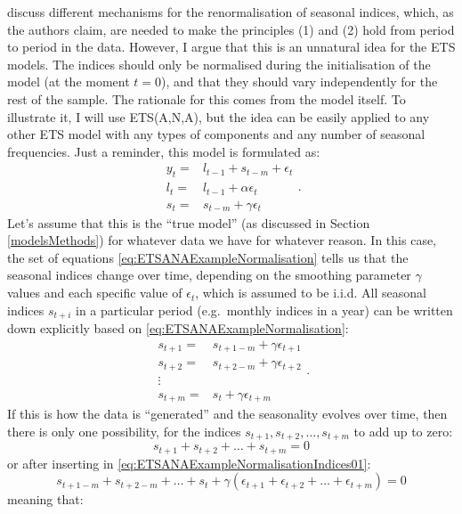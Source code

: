 \documentclass[]{book}
\theoremstyle{definition}
\theoremstyle{definition}
\theoremstyle{definition}
\theoremstyle{definition}
\theoremstyle{remark}
\begin{document}
\citet{Hyndman2008b} discuss different mechanisms for the renormalisation of seasonal indices, which, as the authors claim, are needed to make the principles (1) and (2) hold from period to period in the data. However, I argue that this is an unnatural idea for the ETS models. The indices should only be normalised during the initialisation of the model (at the moment \(t=0\)), and that they should vary independently for the rest of the sample. The rationale for this comes from the model itself. To illustrate it, I will use ETS(A,N,A), but the idea can be easily applied to any other ETS model with any types of components and any number of seasonal frequencies. Just a reminder, this model is formulated as:
\begin{equation}
  \begin{aligned}
  y_t = &l_{t-1} + s_{t-m} + \epsilon_t \\
  {l}_{t} = &l_{t-1} + \alpha\epsilon_t \\
  s_t = &s_{t-m} + \gamma\epsilon_t
  \end{aligned}.
  \label{eq:ETSANAExampleNormalisation}
\end{equation}
Let's assume that this is the ``true model'' (as discussed in Section \ref{modelsMethods}) for whatever data we have for whatever reason. In this case, the set of equations \eqref{eq:ETSANAExampleNormalisation} tells us that the seasonal indices change over time, depending on the smoothing parameter \(\gamma\) values and each specific value of \(\epsilon_t\), which is assumed to be i.i.d. All seasonal indices \(s_{t+i}\) in a particular period (e.g.~monthly indices in a year) can be written down explicitly based on \eqref{eq:ETSANAExampleNormalisation}:
\begin{equation}
  \begin{aligned}
  s_{t+1} = &s_{t+1-m} + \gamma\epsilon_{t+1} \\
  s_{t+2} = &s_{t+2-m} + \gamma\epsilon_{t+2} \\
  \vdots \\
  s_{t+m} = &s_{t} + \gamma\epsilon_{t+m}
  \end{aligned}.
  \label{eq:ETSANAExampleNormalisationIndices01}
\end{equation}
If this is how the data is ``generated'' and the seasonality evolves over time, then there is only one possibility, for the indices \(s_{t+1}, s_{t+2}, \dots, s_{t+m}\) to add up to zero:
\begin{equation}
  s_{t+1}+ s_{t+2}+ \dots+ s_{t+m} = 0
  \label{eq:ETSANAExampleNormalisationIndices02a}
\end{equation}
or after inserting in \eqref{eq:ETSANAExampleNormalisationIndices01}:
\begin{equation}
  s_{t+1-m}+ s_{t+2-m}+ \dots+ s_{t} + \gamma \left(\epsilon_{t+1}+ \epsilon_{t+2}+ \dots+ \epsilon_{t+m}\right) = 0
  \label{eq:ETSANAExampleNormalisationIndices02b}
\end{equation}
meaning that:
\end{document}
